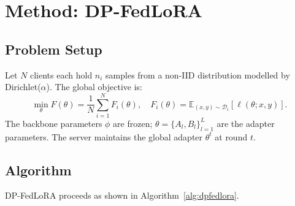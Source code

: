 ﻿\documentclass{article}
\newcommand{\method}{DP-FedLoRA}
\begin{document}
\section{Method: \method{}}
\label{sec:method}

\subsection{Problem Setup}

Let $N$ clients each hold $n_i$ samples from a non-IID distribution
modelled by Dirichlet($\alpha$).
The global objective is:
\[
  \min_{\theta} F(\theta) = \frac{1}{N}\sum_{i=1}^N F_i(\theta),
  \quad F_i(\theta) = \mathbb{E}_{(x,y) \sim \mathcal{D}_i}[\ell(\theta; x, y)].
\]
The backbone parameters $\phi$ are frozen; $\theta = \{A_l, B_l\}_{l=1}^L$
are the adapter parameters.
The server maintains the global adapter $\theta^t$ at round $t$.

\subsection{Algorithm}

\method{} proceeds as shown in Algorithm~\ref{alg:dpfedlora}.
\end{document}
